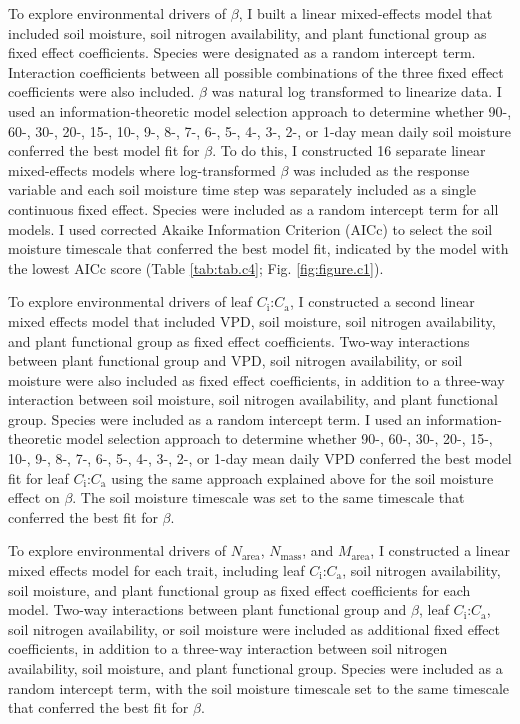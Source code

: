 To explore environmental drivers of $\beta$, I built a linear mixed-effects model that included soil moisture, soil nitrogen availability, and plant functional group as fixed effect coefficients. Species were designated as a random intercept term. Interaction coefficients between all possible combinations of the three fixed effect coefficients were also included. $\beta$ was natural log transformed to linearize data. I used an information-theoretic model selection approach to determine whether 90-, 60-, 30-, 20-, 15-, 10-, 9-, 8-, 7-, 6-, 5-, 4-, 3-, 2-, or 1-day mean daily soil moisture conferred the best model fit for $\beta$. To do this, I constructed 16 separate linear mixed-effects models where log-transformed $\beta$ was included as the response variable and each soil moisture time step was separately included as a single continuous fixed effect. Species were included as a random intercept term for all models. I used corrected Akaike Information Criterion (AICc) to select the soil moisture timescale that conferred the best model fit, indicated by the model with the lowest AICc score (Table \ref{tab:tab.c4}; Fig. \ref{fig:figure.c1}).

To explore environmental drivers of leaf $C_\mathrm{i}$:$C_\mathrm{a}$, I constructed a second linear mixed effects model that included VPD, soil moisture, soil nitrogen availability, and plant functional group as fixed effect coefficients. Two-way interactions between plant functional group and VPD, soil nitrogen availability, or soil moisture were also included as fixed effect coefficients, in addition to a three-way interaction between soil moisture, soil nitrogen availability, and plant functional group. Species were included as a random intercept term. I used an information-theoretic model selection approach to determine whether 90-, 60-, 30-, 20-, 15-, 10-, 9-, 8-, 7-, 6-, 5-, 4-, 3-, 2-, or 1-day mean daily VPD conferred the best model fit for leaf $C_\mathrm{i}$:$C_\mathrm{a}$ using the same approach explained above for the soil moisture effect on $\beta$. The soil moisture timescale was set to the same timescale that conferred the best fit for $\beta$.

To explore environmental drivers of $N_\mathrm{area}$, $N_\mathrm{mass}$, and $M_\mathrm{area}$, I constructed a linear mixed effects model for each trait, including leaf $C_\mathrm{i}$:$C_\mathrm{a}$, soil nitrogen availability, soil moisture, and plant functional group as fixed effect coefficients for each model. Two-way interactions between plant functional group and $\beta$, leaf $C_\mathrm{i}$:$C_\mathrm{a}$, soil nitrogen availability, or soil moisture were included as additional fixed effect coefficients, in addition to a three-way interaction between soil nitrogen availability, soil moisture, and plant functional group. Species were included as a random intercept term, with the soil moisture timescale set to the same timescale that conferred the best fit for $\beta$.

